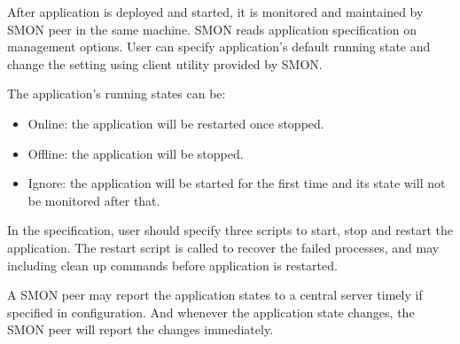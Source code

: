 

After application is deployed and started, it is monitored
and maintained by SMON peer in the same machine. SMON reads
application specification on management options. User can
specify application's default running state and change the
setting using client utility provided by SMON.

The application's running states can be:

\begin{itemize}
  \item Online: the application will be restarted once
  stopped.
  \item Offline: the application will be stopped.
  \item Ignore: the application will be started for the
  first time and its state will not be monitored after
  that.
\end{itemize}

In the specification, user should specify three scripts to
start, stop and restart the application. The restart script
is called to recover the failed processes, and may including
clean up commands before application is restarted.

A SMON peer may report the application states to a central
server timely if specified in configuration. And whenever
the application state changes, the SMON peer will report the
changes immediately.


% 
% 
% 

